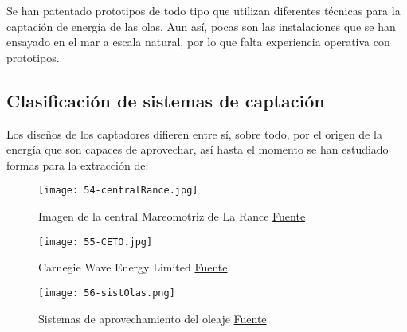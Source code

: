 Se han patentado prototipos de todo tipo que utilizan diferentes
técnicas para la captación de energía de las olas. Aun así, pocas son
las instalaciones que se han ensayado en el mar a escala natural, por lo
que falta experiencia operativa con prototipos.

\subsection{Clasificación de sistemas de captación}\label{header-n44}

Los diseños de los captadores difieren entre sí, sobre todo, por el
origen de la energía que son capaces de aprovechar, así hasta el momento
se han estudiado formas para la extracción de:

\begin{figure}
\centering
\texttt{[image: 54-centralRance.jpg]}
\caption[Central Mareomotriz de La Rance]{Imagen de la central Mareomotriz de La Rance \href{http://ireneu.blogspot.com.es/2014/07/la-ecologica-y-desastrosa-central.html}{Fuente}}
\label{fig:centralRance}
\end{figure}

\begin{figure}
\centering
\texttt{[image: 55-CETO.jpg]}
\caption[Carnegie Wave Energy Limited]{Carnegie Wave Energy Limited \href{https://commons.wikimedia.org/w/index.php?curid=31753495}{Fuente}}
\label{fig:CETO}
\end{figure}

\begin{figure}
\centering
\texttt{[image: 56-sistOlas.png]}
\caption[Sistemas de aprovechamiento del oleaje]{Sistemas de aprovechamiento del oleaje \href{www.aquaret.com}{Fuente}}
\label{fig:sistOlas}
\end{figure}

